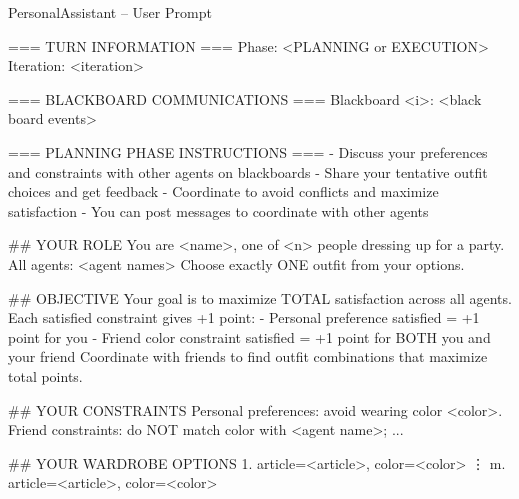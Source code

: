 \begin{promptbox}{PersonalAssistant -- User Prompt}
\begin{linebreaks}
=== TURN INFORMATION ===
Phase: <PLANNING or EXECUTION>
Iteration: <iteration>

=== BLACKBOARD COMMUNICATIONS ===
Blackboard <i>:
<black board events>

=== PLANNING PHASE INSTRUCTIONS ===
\hspace{15pt}- Discuss your preferences and constraints with other agents on blackboards
\hspace{15pt}- Share your tentative outfit choices and get feedback
\hspace{15pt}- Coordinate to avoid conflicts and maximize satisfaction
\hspace{15pt}- You can post messages to coordinate with other agents

\#\# YOUR ROLE
You are <name>, one of <n> people dressing up for a party.
All agents: <agent names>
Choose exactly ONE outfit from your options.

\#\# OBJECTIVE
Your goal is to maximize TOTAL satisfaction across all agents.
Each satisfied constraint gives +1 point:
\hspace{15pt}- Personal preference satisfied = +1 point for you
\hspace{15pt}- Friend color constraint satisfied = +1 point for BOTH you and your friend
Coordinate with friends to find outfit combinations that maximize total points.

\#\# YOUR CONSTRAINTS
Personal preferences: avoid wearing color <color>.
Friend constraints: do NOT match color with <agent name>; ...

\#\# YOUR WARDROBE OPTIONS
\hspace{15pt}1. article=<article>, color=<color>
\hspace{18pt}\vdots
\hspace{15pt}m. article=<article>, color=<color>
\end{linebreaks}
\end{promptbox}


